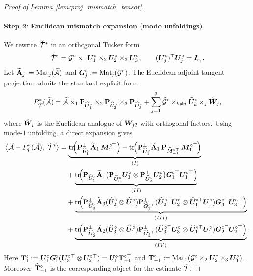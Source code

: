 \documentclass[authoryear,preprint,review,12pt]{elsarticle}
\begin{document}
{\begin{proof}[Proof of Lemma~\ref{lem:proj_mismatch_tensor}]
		\paragraph{Step 2: Euclidean mismatch expansion (mode unfoldings)}
		We rewrite $\check{\mathcal{T}}^\ast$ in an orthogonal Tucker form
		\[
		\check{\mathcal{T}}^\ast=\mathcal G^\circ\times_1\boldsymbol U_1^\circ\times_2\boldsymbol U_2^\circ\times_3\boldsymbol U_3^\circ,
		\qquad (\boldsymbol U_j^\circ)^\top\boldsymbol U_j^\circ=\boldsymbol I_{r_j}.
		\] 
		Let $\widetilde{\mathbf{A}}_j:=\mathrm{Mat}_j(\widetilde{\mathcal{A}})$ and $\boldsymbol G_j^\circ:=\mathrm{Mat}_j(\mathcal G^\circ)$. 
		The Euclidean adjoint tangent projection admits the standard explicit form:
		\[
		P_{\check{\mathcal{T}}}^\ast(\widetilde{\mathcal{A}})
		=
		\widetilde{\mathcal{A}}\times_1\mathbf{P}_{\widehat{\boldsymbol U}_1^\circ}\times_2\mathbf{P}_{\widehat{\boldsymbol U}_2^\circ}\times_3\mathbf{P}_{\widehat{\boldsymbol U}_3^\circ}
		+\sum_{j=1}^3 \widehat{\mathcal G}^\circ\times_{k\neq j}\widehat{\boldsymbol U}_k^\circ\times_j \check{\boldsymbol W}_j,
		\]
		where $\check{\boldsymbol W}_j$ is the Euclidean analogue of $\boldsymbol W_{j2}$ with orthogonal factors.
		Using mode-$1$ unfolding,
		a direct expansion gives
		\begin{align}
			\big\langle \widetilde{\mA}-P_{\check{\mT}}^\ast(\widetilde{\mA}),\ \check{\mT}^\ast\big\rangle
			&=
			\underbrace{\mathrm{tr}\!\Big(\bP_{\widehat{\bU}_1^\circ}^{\perp}\widetilde{\bA}_1\,\bM_1^{\circ\top}\Big)
				-\mathrm{tr}\!\Big(\bP_{\widehat{\bU}_1^\circ}^{\perp}\widetilde{\bA}_1\,\bP_{\widehat{\bM}_{-1}^{\circ\top}}\,\bM_1^{\circ\top}\Big)}_{(I)}
			\label{eq:I_def}
			\\
			&\quad+
			\underbrace{\mathrm{tr}\!\Big(\bP_{\widehat{\bU}_1^\circ}\widetilde{\bA}_1\big(\bP_{\widehat{\bU}_3^\circ}^{\perp}\bU_3^\circ\otimes
				\bP_{\widehat{\bU}_2^\circ}^{\perp}\bU_2^\circ\big)\bG_1^{\circ\top}\bU_1^{\circ\top}\Big)}_{(II)}
			\label{eq:II_def}
			\\
			&\quad+
			\underbrace{\mathrm{tr}\!\Big(
				\bP_{\widehat{\bU}_3^\circ}^{\perp}\widetilde{\bA}_3(\widehat{\bU}_2^\circ\otimes \widehat{\bU}_1^\circ)
				\bP_{\widehat{\bG}_3^{\circ\top}}^{\perp}(\widehat{\bU}_2^{\circ\top}\bU_2^\circ\otimes \widehat{\bU}_1^{\circ\top}\bU_1^\circ)
				\bG_3^{\circ\top}\bU_3^{\circ\top}
				\Big)}_{(III)}
			\label{eq:III_def}
			\\
			&\quad+
			\underbrace{\mathrm{tr}\!\Big(
				\bP_{\widehat{\bU}_2^\circ}^{\perp}\widetilde{\bA}_2(\widehat{\bU}_3^\circ\otimes \widehat{\bU}_1^\circ)
				\bP_{\widehat{\bG}_2^{\circ\top}}^{\perp}(\widehat{\bU}_3^{\circ\top}\bU_3^\circ\otimes \widehat{\bU}_1^{\circ\top}\bU_1^\circ)
				\bG_2^{\circ\top}\bU_2^{\circ\top}
				\Big)}_{(IV)}.
			\label{eq:IV_def}
		\end{align}
		Here $\mathbf{T}_1^\circ:=\boldsymbol U_1^\circ\boldsymbol G_1^\circ(\boldsymbol U_3^{\circ\top}\otimes\boldsymbol U_2^{\circ\top})=\boldsymbol U_1^\circ\mathbf{T}_{-1}^{\circ\top}$ and
		$\mathbf{T}_{-1}^\circ:=\mathrm{Mat}_1(\mathcal G^\circ\times_2\boldsymbol U_2^\circ\times_3\boldsymbol U_3^\circ)$.
		Moreover $\widehat{\mathbf{T}}_{-1}^\circ$ is the corresponding object for the estimate $\check{\mathcal{T}}$.
		

\end{proof}}
\end{document}
